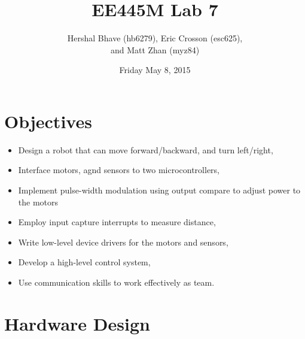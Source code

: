 \documentclass[12pt]{article}
\title{EE445M Lab 7}
\author{Hershal Bhave (hb6279), Eric Crosson (esc625), \\
  and Matt Zhan (myz84)}
\date{Friday May 8, 2015}
\begin{document}
\maketitle

\section{Objectives}

\begin{itemize}
\item Design a robot that can move forward/backward, and turn left/right,
\item Interface motors, agnd sensors to two microcontrollers,
\item Implement pulse-width modulation using output compare to adjust power to the motors
\item Employ input capture interrupts to measure distance,
\item Write low-level device drivers for the motors and sensors,
\item Develop a high-level control system,
\item Use communication skills to work effectively as team.
\end{itemize}

\section{Hardware Design}

\end{document}
